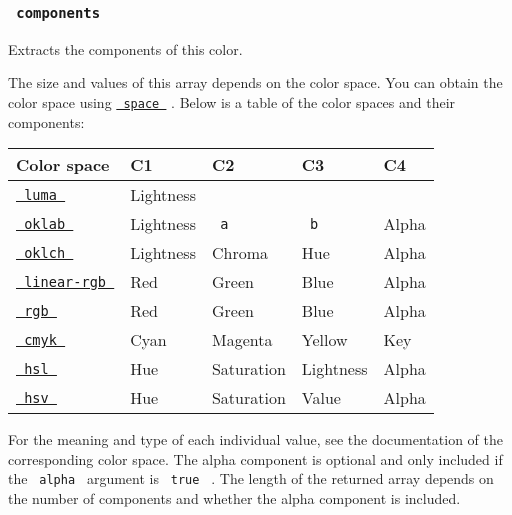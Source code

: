 \subsubsection{\texorpdfstring{\texttt{\ components\ }}{ components }}\label{definitions-components}

Extracts the components of this color.

The size and values of this array depends on the color space. You can
obtain the color space using
\href{/docs/reference/visualize/color/\#definitions-space}{\texttt{\ space\ }}
. Below is a table of the color spaces and their components:

\begin{longtable}[]{@{}lllll@{}}
\toprule\noalign{}
Color space & C1 & C2 & C3 & C4 \\
\midrule\noalign{}
\endhead
\bottomrule\noalign{}
\endlastfoot
\href{/docs/reference/visualize/color/\#definitions-luma}{\texttt{\ luma\ }}
& Lightness & & & \\
\href{/docs/reference/visualize/color/\#definitions-oklab}{\texttt{\ oklab\ }}
& Lightness & \texttt{\ a\ } & \texttt{\ b\ } & Alpha \\
\href{/docs/reference/visualize/color/\#definitions-oklch}{\texttt{\ oklch\ }}
& Lightness & Chroma & Hue & Alpha \\
\href{/docs/reference/visualize/color/\#definitions-linear-rgb}{\texttt{\ linear-rgb\ }}
& Red & Green & Blue & Alpha \\
\href{/docs/reference/visualize/color/\#definitions-rgb}{\texttt{\ rgb\ }}
& Red & Green & Blue & Alpha \\
\href{/docs/reference/visualize/color/\#definitions-cmyk}{\texttt{\ cmyk\ }}
& Cyan & Magenta & Yellow & Key \\
\href{/docs/reference/visualize/color/\#definitions-hsl}{\texttt{\ hsl\ }}
& Hue & Saturation & Lightness & Alpha \\
\href{/docs/reference/visualize/color/\#definitions-hsv}{\texttt{\ hsv\ }}
& Hue & Saturation & Value & Alpha \\
\end{longtable}

For the meaning and type of each individual value, see the documentation
of the corresponding color space. The alpha component is optional and
only included if the \texttt{\ alpha\ } argument is \texttt{\ true\ } .
The length of the returned array depends on the number of components and
whether the alpha component is included.

